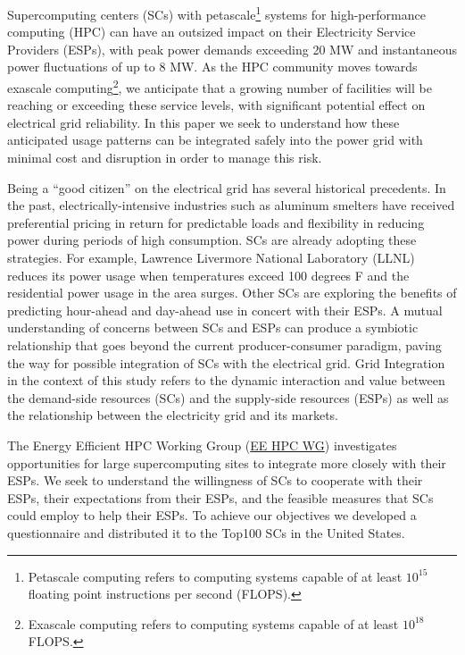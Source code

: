 Supercomputing centers (SCs) with petascale\footnote{Petascale computing refers to computing systems capable of at
least \(10^{15}\) floating point instructions per second (FLOPS).} 
systems for high-performance computing (HPC) can have an outsized 
impact on their Electricity Service Providers (ESPs), with peak 
power demands %
exceeding 20 MW and instantaneous power fluctuations of up to 8 MW. 
As the HPC community moves towards exascale computing\footnote{Exascale computing refers to computing systems capable of at
least \(10^{18}\)FLOPS.}, we anticipate that a growing number of facilities will
be reaching or exceeding these service levels, with significant potential 
effect on electrical grid reliability.
In this paper we seek to understand how these anticipated
usage patterns can be integrated safely into the power grid with minimal cost 
and disruption in order to manage
this risk.

Being a ``good citizen'' on the electrical grid has several historical precedents.
In the past, electrically-intensive industries such as aluminum smelters 
have received preferential pricing in return for predictable loads and
flexibility in reducing power during periods of high consumption.
SCs are already adopting these strategies. 
For example, Lawrence Livermore National Laboratory (LLNL)
reduces its power usage when temperatures exceed 
100 degrees F and the residential power usage in the area surges.
Other %
SCs are exploring the benefits of predicting hour-ahead and 
day-ahead use in concert with their %
ESPs.
A mutual understanding of concerns between SCs and ESPs can 
produce a symbiotic relationship that goes beyond the current producer-consumer 
paradigm, paving the way for possible integration of %
SCs with the electrical grid. Grid Integration in the context of this study refers to the dynamic interaction and value between the demand-side resources (SCs) and the supply-side resources (ESPs) as well as the relationship between the electricity grid and its markets.

The Energy Efficient HPC Working Group (\href {http://eehpcwg.lbl.gov/}{EE HPC WG}) 
investigates opportunities for large supercomputing sites to 
integrate more closely with their ESPs.
We seek to understand the willingness of SCs to
cooperate with their ESPs, their expectations from their ESPs, and the feasible measures
that SCs could employ to help their ESPs.
To achieve our objectives we developed a questionnaire and distributed it to 
the Top100 SCs in the United States. 

